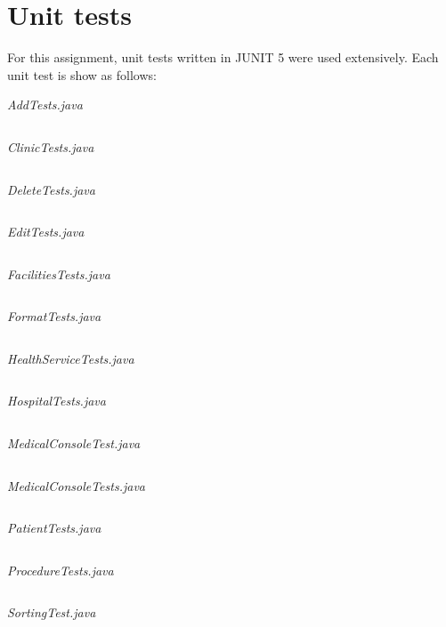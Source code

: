 \documentclass{article}
\begin{document}
	\section{Unit tests}\label{sec:unit_tests} %
	For this assignment, unit tests written in JUNIT 5 \textcite{Junit5} were used extensively. Each unit test is show as follows:
	
	\textit{AddTests.java} 
	\inputminted{java}{src/test/java/com/yvesstraten/medicalconsole/tests/AddTests.java}

	\textit{ClinicTests.java} 
	\inputminted{java}{src/test/java/com/yvesstraten/medicalconsole/tests/ClinicTests.java}

	\textit{DeleteTests.java} 
	\inputminted{java}{src/test/java/com/yvesstraten/medicalconsole/tests/DeleteTests.java}

	\textit{EditTests.java}\label{Edit_tests} 
	\inputminted{java}{src/test/java/com/yvesstraten/medicalconsole/tests/EditTests.java}

	\textit{FacilitiesTests.java} 
	\inputminted{java}{src/test/java/com/yvesstraten/medicalconsole/tests/FacilitiesTests.java}

	\textit{FormatTests.java} 
	\inputminted{java}{src/test/java/com/yvesstraten/medicalconsole/tests/FormatTests.java}

	\textit{HealthServiceTests.java} 
	\inputminted{java}{src/test/java/com/yvesstraten/medicalconsole/tests/HealthServiceTests.java}

	\textit{HospitalTests.java} 
	\inputminted{java}{src/test/java/com/yvesstraten/medicalconsole/tests/HospitalTests.java}

	\textit{MedicalConsoleTest.java} 
	\inputminted{java}{src/test/java/com/yvesstraten/medicalconsole/tests/MedicalConsoleTest.java}

	\textit{MedicalConsoleTests.java} 
	\inputminted{java}{src/test/java/com/yvesstraten/medicalconsole/tests/MedicalConsoleTests.java}

	\textit{PatientTests.java} 
	\inputminted{java}{src/test/java/com/yvesstraten/medicalconsole/tests/PatientTests.java}

	\textit{ProcedureTests.java} 
	\inputminted{java}{src/test/java/com/yvesstraten/medicalconsole/tests/ProcedureTests.java}

	\textit{SortingTest.java}\label{sorting_tests} 
	\inputminted{java}{src/test/java/com/yvesstraten/medicalconsole/tests/SortingTest.java}
\end{document}
